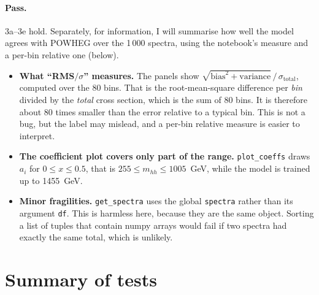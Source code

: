 \documentclass[11pt]{article}
\newcommand{\code}[1]{\texttt{#1}}
\newcommand{\mhh}{m_{hh}}
\begin{document}
\paragraph{Pass.} 3a--3e hold. Separately, for information, I will summarise how
well the model agrees with POWHEG over the 1\,000 spectra, using the notebook's
measure and a per-bin relative one (below).

\begin{watch}
\begin{itemize}
  \item \textbf{What ``RMS$/\sigma$'' measures.} The panels show
  $\sqrt{\text{bias}^2 + \text{variance}}\,/\,\sigma_\text{total}$, computed over the 80
  bins. That is the root-mean-square difference per \emph{bin} divided by the
  \emph{total} cross section, which is the sum of 80 bins. It is therefore
  about 80 times smaller than the error relative to a typical bin. This is not a bug,
  but the label may mislead, and a per-bin relative measure is easier to interpret.
  \item \textbf{The coefficient plot covers only part of the range.}
  \code{plot\_coeffs} draws $a_i$ for $0 \le x \le 0.5$, that is
  $255 \le \mhh \le 1005$~GeV, while the model is trained up to 1455~GeV.
  \item \textbf{Minor fragilities.} \code{get\_spectra} uses the global
  \code{spectra} rather than its argument \code{df}. This is harmless here,
  because they are the same object. Sorting a list of tuples that contain numpy
  arrays would fail if two spectra had exactly the same total, which is unlikely.
\end{itemize}
\end{watch}

\section{Summary of tests}
\end{document}
